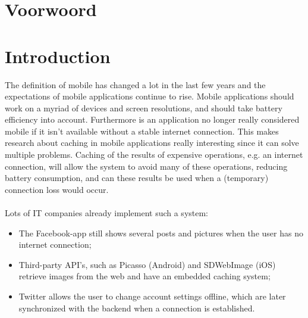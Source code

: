 \documentclass[pdftex,a4paper,12pt,twoside]{report}
\begin{document}
\begin{abstract}
  \lipsum[1-4]
\end{abstract}

\chapter*{Voorwoord}
\label{ch:voorwoord}

\lipsum[5-6]

\tableofcontents



\chapter{Introduction}
\label{ch:introduction}
The definition of mobile has changed a lot in the last few years and the expectations of mobile applications continue to rise.
Mobile applications should work on a myriad of devices and screen resolutions, and should take battery efficiency into account.
Furthermore is an application no longer really considered mobile if it isn't available without a stable internet connection.
This makes research about caching in mobile applications really interesting since it can solve multiple problems.
Caching of the results of expensive operations, e.g. an internet connection, will allow the system to avoid many of these operations,
reducing battery consumption, and can these results be used when a (temporary) connection loss would occur.
\\\\
Lots of IT companies already implement such a system:
\begin{itemize}
\item The Facebook-app still shows several posts and pictures when the user has no internet connection;
\item Third-party API's, such as Picasso (Android) and SDWebImage (iOS) retrieve images from the web and have an embedded caching system;
\item Twitter allows the user to change account settings offline, which are later synchronized with the backend when a connection is established\footnotemark.
\end{itemize}
\newpage
\end{document}
